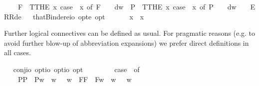 \begin{isabellebody}
\ \ \ \ F{\isacharparenleft}{\isacharunderscore}{\isacharparenright}\ {\isasymRightarrow}\ T{\isacharparenleft}THE\ x{\isachardot}\ case\ {\isacharparenleft}{\isasymPhi}\ x{\isacharparenright}\ of\ F\ {\isasympsi}\ {\isasymRightarrow}\ {\isasympsi}\ dw{\isacharparenright}\ {\isacharbar}\ P{\isacharparenleft}{\isacharunderscore}{\isacharparenright}\ {\isasymRightarrow}\ T{\isacharparenleft}THE\ x{\isachardot}\ case\ {\isacharparenleft}{\isasymPhi}\ x{\isacharparenright}\ of\ P\ {\isasympsi}\ {\isasymRightarrow}\ {\isasympsi}\ dw{\isacharparenright}\ {\isacharbar}\ {\isacharunderscore}\ {\isasymRightarrow}\ ERR{\isacharparenleft}de{\isacharparenright}{\isachardoublequoteclose}\isanewline
\ \isamarkupfalse%
\ thatBinder{\isacharcolon}{\isacharcolon}{\isachardoublequoteopen}{\isacharparenleft}e{\isasymRightarrow}io\ opt{\isacharparenright}{\isasymRightarrow}e\ opt{\isachardoublequoteclose}\ {\isacharparenleft}\ {\isachardoublequoteopen}\isactrlbold {\isasymiota}{\isachardoublequoteclose}\ {\isacharbrackleft}{}{\isacharbrackright}\ {}{\isacharparenright}\ \ \ {\isachardoublequoteopen}\isactrlbold {\isasymiota}x{\isachardot}\ {\isasymphi}\ x\ {\isasymequiv}\ \isactrlbold {\isasymiota}\ {\isasymphi}{\isachardoublequoteclose}%
\isamarkuptrue%
%
\begin{isamarkuptext}%
Further logical connectives can be defined as usual. For pragmatic reasons (e.g. to avoid further blow-up of
  abbreviation expansions) we prefer direct definitions in all cases.%
\end{isamarkuptext}%
\isamarkuptrue%
\ \isamarkupfalse%
\ conj{\isacharcolon}{\isacharcolon}{\isachardoublequoteopen}io\ opt{\isasymRightarrow}io\ opt{\isasymRightarrow}io\ opt{\isachardoublequoteclose}\ {\isacharparenleft}\ {\isachardoublequoteopen}\isactrlbold {\isasymand}{\isachardoublequoteclose}\ {}{}{\isacharparenright}\ \ {\isachardoublequoteopen}{\isasymphi}\ \isactrlbold {\isasymand}\ {\isasympsi}\ {\isasymequiv}\ case\ {\isacharparenleft}{\isasymphi}{\isacharcomma}{\isasympsi}{\isacharparenright}\ of\isanewline
\ \ \ \ {\isacharparenleft}P{\isacharparenleft}{\isasymalpha}{\isacharparenright}{\isacharcomma}P{\isacharparenleft}{\isasymbeta}{\isacharparenright}{\isacharparenright}\ {\isasymRightarrow}\ P{\isacharparenleft}{\isasymlambda}w{\isachardot}\ {\isasymalpha}\ w\ {\isasymand}\ {\isasymbeta}\ w{\isacharparenright}\ {\isacharbar}\ {\isacharparenleft}F{\isacharparenleft}{\isasymalpha}{\isacharparenright}{\isacharcomma}F{\isacharparenleft}{\isasymbeta}{\isacharparenright}{\isacharparenright}\ {\isasymRightarrow}\ F{\isacharparenleft}{\isasymlambda}w{\isachardot}\ {\isasymalpha}\ w\ {\isasymand}\ {\isasymbeta}\ w{\isacharparenright}\ {\isacharbar}\ \isanewline

\end{isabellebody}
